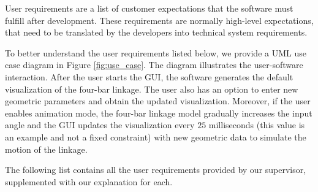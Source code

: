 \documentclass{article}
\begin{document}
User requirements are a list of customer expectations that the software must fulfill after development. These requirements are normally high-level expectations, that need to be translated by the developers into technical system requirements.

To better understand the user requirements listed below, we provide a UML use case diagram in Figure \ref{fig:use_case}. The diagram illustrates the user-software interaction. After the user starts the GUI, the software generates the default visualization of the four-bar linkage. The user also has an option to enter new geometric parameters and obtain the updated visualization. Moreover, if the user enables animation mode, the four-bar linkage model gradually increases the input angle and the GUI updates the visualization every $25$ milliseconds (this value is an example and not a fixed constraint) with new geometric data to simulate the motion of the linkage.

The following list contains all the user requirements provided by our supervisor, supplemented with our explanation for each.
\end{document}
